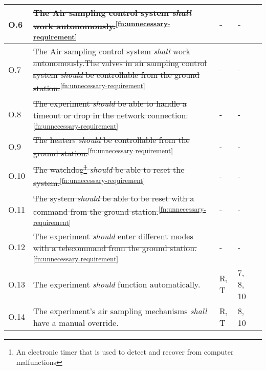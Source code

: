 \begin{longtable}[]{|m{}| m{} |m{} |m{}|m{}|}
O.6  & \st{The Air sampling control system \textit{shall} work autonomously.}\textsuperscript{\ref{fn:unnecessary-requirement}}                                                                                                     &       -     &  -          &        \\ \hline
O.7  & \st{The Air sampling control system \textit{shall} work autonomously.The valves in air sampling control system \textit{should} be controllable from the ground station.}\textsuperscript{\ref{fn:unnecessary-requirement}} &      -       &   -         &        \\ \hline
O.8  & \st{The experiment \textit{should} be able to handle a timeout or drop in the network connection.}\textsuperscript{\ref{fn:unnecessary-requirement}}                                                                         &    -         &  -  &        \\ \hline
O.9  & \st{The heaters \textit{should} be controllable from the ground station.}\textsuperscript{\ref{fn:unnecessary-requirement}}                                                                                                  &     -      &  -           &        \\ \hline
O.10 & \st{The watchdog\footnote{An electronic timer that is used to detect and recover from computer malfunctions} \textit{should} be able to reset the system.}\textsuperscript{\ref{fn:unnecessary-requirement}}               &    -        & -          &        \\ \hline
O.11 & \st{The system \textit{should} be able to be reset with a command from the ground station.}\textsuperscript{\ref{fn:unnecessary-requirement}}                                                                                &     -      & -            &        \\ \hline
O.12 & \st{The experiment \textit{should} enter different modes with a telecommand from the ground station.}\textsuperscript{\ref{fn:unnecessary-requirement}}                                                                      &      -        & -    &        \\ \hline
O.13 & The experiment \textit{should} function automatically.                                                           &      R, T        & 7, 8, 10            &        \\ \hline
O.14 & The experiment's air sampling mechanisms \textit{shall} have a manual override.                                                           &      R, T        & 8, 10            &        \\ \hline

\end{longtable}
